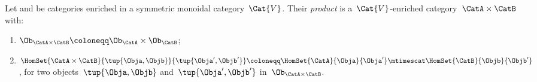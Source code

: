 \begin{widepar}
    \begin{center}
    \end{center}

    \begin{center}
    \end{center}
\end{widepar}

\begin{definition}
    \label{def:prod_enrich_cat}
    Let \CatA and \CatB be categories enriched in a symmetric monoidal category~$\Cat{V}$.
    Their \emph{product} is a~$\Cat{V}$-enriched category~$\CatA\times \CatB$ with:
    \begin{enumerate}
        \item $\Ob_{\CatA\times \CatB}\coloneqq \Ob_\CatA \times \Ob_\CatB$;
        \item $\HomSet{\CatA\times \CatB}{\tup{\Obja,\Objb}}{\tup{\Obja',\Objb'}}\coloneqq \HomSet{\CatA}{\Obja}{\Obja'}\mtimescat \HomSet{\CatB}{\Objb}{\Objb'}$, for two objects~$\tup{\Obja,\Objb}$ and~$\tup{\Obja',\Objb'}$ in~$\Ob_{\CatA\times \CatB}$.
    \end{enumerate}
\end{definition}


